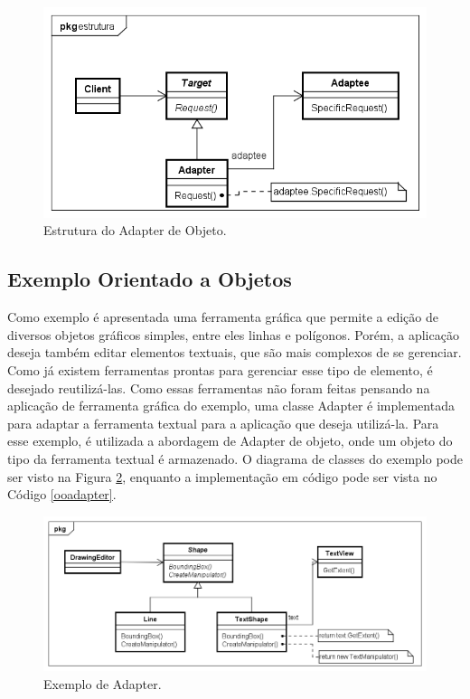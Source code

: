\begin{figure}[htb]
	\caption{\label{adapter_alt_struct}Estrutura do Adapter de Objeto.}
	\begin{center}
	    \includegraphics[scale=0.5]{5_padroes-contexto-funcional/5.2_estruturais/5.2.1_adapter/adapter_objeto_estrutura.png}
	\end{center}
\end{figure}

\subsection*{Exemplo Orientado a Objetos}

Como exemplo é apresentada uma ferramenta gráfica 
que permite a edição de diversos objetos gráficos 
simples, entre eles linhas e polígonos. Porém, 
a aplicação deseja também editar elementos textuais, 
que são mais complexos de se gerenciar. Como já existem 
ferramentas prontas para gerenciar esse tipo de 
elemento, é desejado reutilizá-las. Como essas 
ferramentas não foram feitas pensando na 
aplicação de ferramenta gráfica do exemplo, uma 
classe Adapter é implementada para adaptar a 
ferramenta textual para a aplicação que deseja 
utilizá-la. Para esse exemplo, é utilizada a 
abordagem de Adapter de objeto, onde um objeto 
do tipo da ferramenta textual é armazenado. O 
diagrama de classes do exemplo pode ser visto na 
Figura \ref{adapter_exemplo}, enquanto a 
implementação em código pode ser vista no Código 
\ref{ooadapter}.


\begin{figure}[htb]
	\caption{\label{adapter_exemplo}Exemplo de Adapter.}
	\begin{center}
	    \includegraphics[scale=0.5]{5_padroes-contexto-funcional/5.2_estruturais/5.2.1_adapter/adapter_exemplo.png}
	\end{center}
\end{figure}


